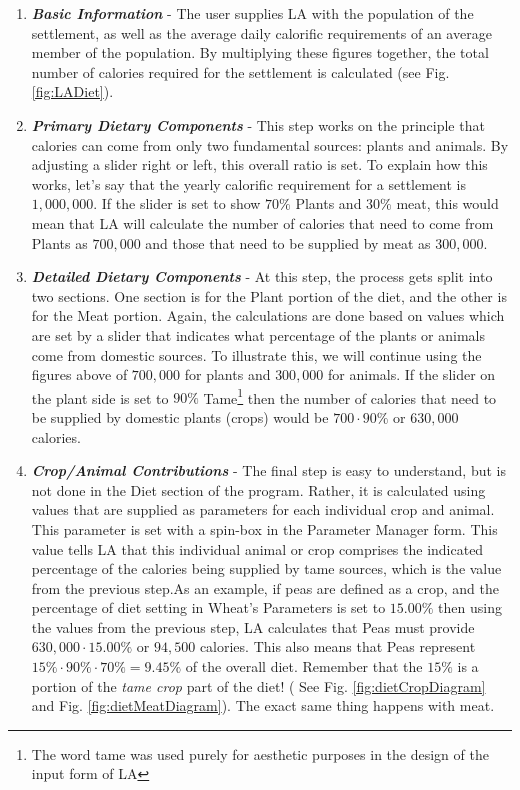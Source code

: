     \begin{enumerate}
      \item \textbf{\textit{Basic Information}} - The user supplies LA with the population of the settlement, as well as the average daily calorific requirements of an average member of the population.  By multiplying these figures together, the total number of calories required for the settlement is calculated (see Fig. \ref{fig:LADiet}).

      \item \textbf{\textit{Primary Dietary Components}} - This step works on the principle that calories can come from only two fundamental sources: plants and animals.  By adjusting a slider right or left, this overall ratio is set.  To explain how this works, let's say that the yearly calorific requirement for a settlement is $1,000,000$.  If the slider is set to show $70\%$ Plants and $30\%$ meat, this would mean that LA will calculate the number of calories that need to come from Plants as $700,000$ and those that need to be supplied by meat as $300,000$.

      \item \textbf{\textit{Detailed Dietary Components}} - At this step, the process gets split into two sections.  One section is for the Plant portion of the diet, and the other is for the Meat portion.  Again, the calculations are done based on values which are set by a slider that indicates what percentage of the plants or animals come from domestic sources.  To illustrate this, we will continue using the figures above of $700,000$ for plants and $300,000$ for animals.  If the slider on the plant side is set to $90\%$ Tame\footnote{The word tame was used purely for aesthetic purposes in the design of the input form of LA} then the number of calories that need to be supplied by domestic plants (crops) would be $700 \cdot 90\%$ or $630,000$ calories.  

      \item \textbf{\textit{Crop/Animal Contributions}} - The final step is easy to understand, but is not done in the Diet section of the program.  Rather, it is calculated using values that are supplied as parameters for each individual crop and animal.  This parameter is set with a spin-box in the Parameter Manager form.  This value tells LA that this individual animal or crop comprises the indicated percentage of the calories being supplied by tame sources, which is the value from the previous step.As an example, if peas are defined as a crop, and the percentage of diet setting in Wheat's Parameters is set to $15.00\%$ then using the values from the previous step, LA calculates that Peas must provide $630,000 \cdot 15.00\%$ or $94,500$ calories.  This also means that Peas represent $15\%\cdot90\%\cdot70\%=9.45\%$ of the overall diet.  Remember that the $15\%$ is a portion of the \textit{tame crop} part of the diet! ( See Fig. \ref{fig:dietCropDiagram} and Fig. \ref{fig:dietMeatDiagram}).  The exact same thing happens with meat.
    \end{enumerate}

